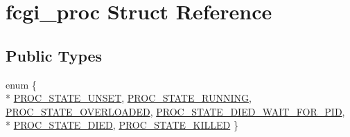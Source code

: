 \hypertarget{structfcgi__proc}{\section{fcgi\-\_\-proc Struct Reference}
\label{structfcgi__proc}
}
\subsection*{Public Types}
\begin{DoxyCompactItemize}
\item 
enum \{ \\*
\hyperlink{structfcgi__proc_a8e6e996392fa6f272c73241107c95f97a9488c941c3e86fb7333440935a3775cd}{P\-R\-O\-C\-\_\-\-S\-T\-A\-T\-E\-\_\-\-U\-N\-S\-E\-T}, 
\hyperlink{structfcgi__proc_a8e6e996392fa6f272c73241107c95f97ad0999f13c2edaf274f4d6d11bf36474b}{P\-R\-O\-C\-\_\-\-S\-T\-A\-T\-E\-\_\-\-R\-U\-N\-N\-I\-N\-G}, 
\hyperlink{structfcgi__proc_a8e6e996392fa6f272c73241107c95f97ad07ee29b3105fa34843a259b9f6f7ff4}{P\-R\-O\-C\-\_\-\-S\-T\-A\-T\-E\-\_\-\-O\-V\-E\-R\-L\-O\-A\-D\-E\-D}, 
\hyperlink{structfcgi__proc_a8e6e996392fa6f272c73241107c95f97a64af87256fbfdd249e186aa90773ce0b}{P\-R\-O\-C\-\_\-\-S\-T\-A\-T\-E\-\_\-\-D\-I\-E\-D\-\_\-\-W\-A\-I\-T\-\_\-\-F\-O\-R\-\_\-\-P\-I\-D}, 
\\*
\hyperlink{structfcgi__proc_a8e6e996392fa6f272c73241107c95f97a45f6a80f5e389a2351d44c25fe7e06ff}{P\-R\-O\-C\-\_\-\-S\-T\-A\-T\-E\-\_\-\-D\-I\-E\-D}, 
\hyperlink{structfcgi__proc_a8e6e996392fa6f272c73241107c95f97a6d2de4704ed1414aafbc9d6ab53644aa}{P\-R\-O\-C\-\_\-\-S\-T\-A\-T\-E\-\_\-\-K\-I\-L\-L\-E\-D}
 \}
\end{DoxyCompactItemize}
